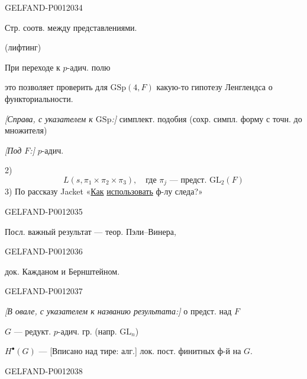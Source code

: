 \begin{GelfandAdjacentEvidence}{GELFAND-P001203}{4}


Стр. соотв. между представлениями.

(лифтинг)

При переходе к $p$-адич. полю

это позволяет проверить для \(\mathrm{GSp}(4,F)\) какую-то гипотезу Ленглендса о функториальности.

\textit{[Справа, с указателем к \(\mathrm{GSp}\):]} симплект. подобия (сохр. симпл. форму с точн. до множителя)

\textit{[Под \(F\):]} $p$-адич.

2) 
\[
L(s,\pi_1\times\pi_2\times\pi_3),\quad
\text{где }\pi_j\text{ --- предст. }\mathrm{GL}_2(F)
\]
3) По рассказу Jacket «\underline{Как} \underline{использовать} ф-лу следа?»
\end{GelfandAdjacentEvidence}
\begin{GelfandAdjacentEvidence}{GELFAND-P001203}{5}


Посл. важный результат --- теор. Пэли--Винера,
\end{GelfandAdjacentEvidence}
\begin{GelfandAdjacentEvidence}{GELFAND-P001203}{6}

док. Кажданом и Бернштейном.

\end{GelfandAdjacentEvidence}
\begin{GelfandAdjacentEvidence}{GELFAND-P001203}{7}


\textit{[В овале, с указателем к названию результата:]} о предст. над \(F\)

\(G\) --- редукт. $p$-адич. гр. (напр. \(\mathrm{GL}_n\))

\(H^{\bullet}(G)\) --- [Вписано над тире: алг.] лок. пост. финитных ф-й на \(G\).
\end{GelfandAdjacentEvidence}
\begin{GelfandAdjacentEvidence}{GELFAND-P001203}{8}

\end{GelfandAdjacentEvidence}
